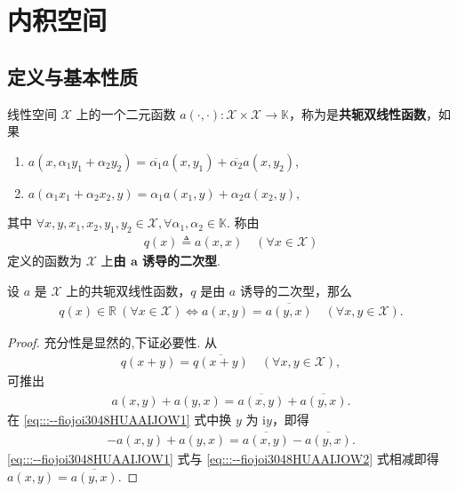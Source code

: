 \documentclass[../../main.tex]{subfiles}%
\begin{document}
\section{内积空间}

\subsection{定义与基本性质}

\begin{definition}
线性空间 $\mathscr{X}$ 上的一个二元函数 $a(\cdot,\cdot):\mathscr{X}\times\mathscr{X}\to\mathbb{K}$，称为是\textbf{共轭双线性函数}，如果
\begin{enumerate}[(1)]
\item $a(x,\alpha_1y_1+\alpha_2y_2)=\overline{\alpha_1}a(x,y_1)+\overline{\alpha_2}a(x,y_2)$,
\item $a(\alpha_1x_1+\alpha_2x_2,y)=\alpha_1a(x_1,y)+\alpha_2a(x_2,y)$,
\end{enumerate}
其中 $\forall x,y,x_1,x_2,y_1,y_2\in\mathscr{X},\forall\alpha_1,\alpha_2\in\mathbb{K}$. 称由
\begin{align*}
q(x)\triangleq a(x,x)\quad(\forall x\in\mathscr{X})
\end{align*}
定义的函数为 $\mathscr{X}$ 上\textbf{由 $\bm{a}$ 诱导的二次型}.
\end{definition}

\begin{proposition}\label{proposition:共轭双线性函数基本性质}
设 $a$ 是 $\mathscr{X}$ 上的共轭双线性函数，$q$ 是由 $a$ 诱导的二次型，那么
\begin{align*}
q(x)\in\mathbb{R}\ (\forall x\in\mathscr{X})\iff a(x,y)=\overline{a(y,x)}\quad(\forall x,y\in\mathscr{X}).
\end{align*}
\end{proposition}
\begin{proof}

充分性是显然的,下证必要性. 从
\begin{align*}
q(x+y)=\overline{q(x+y)}\quad(\forall x,y\in\mathscr{X}),
\end{align*}
可推出
\begin{align}
a(x,y)+a(y,x)=\overline{a(x,y)}+\overline{a(y,x)}.\label{eq:::--fiojoi3048HUAAIJOW1}
\end{align}
在 \eqref{eq:::--fiojoi3048HUAAIJOW1} 式中换 $y$ 为 $\mathrm{i}y$，即得
\begin{align}
-a(x,y)+a(y,x)=\overline{a(x,y)}-\overline{a(y,x)}.\label{eq:::--fiojoi3048HUAAIJOW2}
\end{align}
\eqref{eq:::--fiojoi3048HUAAIJOW1} 式与 \eqref{eq:::--fiojoi3048HUAAIJOW2} 式相减即得 $a(x,y)=\overline{a(y,x)}$.

\end{proof}
\end{document}

